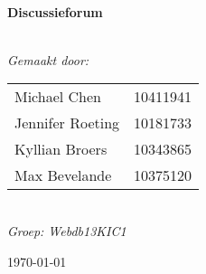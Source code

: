 \begin{titlepage}

\begin{center}


\HRule \\[0.4cm]
{ \huge \bfseries Discussieforum}\\[0.4cm]
\HRule \\[0.4cm]

\vfill

\end{center}

\begin{minipage}{0.4\textwidth}
\begin{flushleft} \large
\emph{Gemaakt door:}\\[0.5cm]
\begin{tabular}{ll}
Michael Chen & 10411941\\
Jennifer Roeting &10181733\\
Kyllian Broers &10343865\\
Max Bevelande& 10375120\\
\end{tabular}\\[0.5cm]
\emph{Groep: Webdb13KIC1}
\end{flushleft}

\end{minipage}
\vfill
{\large \today}

\end{titlepage}
